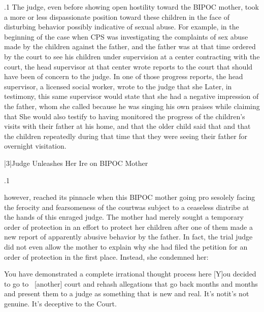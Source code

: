 \documentclass[11pt, twoside]{article}
\begin{document}
{\p.1{%
The judge, even before showing open hostility toward the BIPOC
mother, took a more or less dispassionate position toward these children
in the face of disturbing behavior possibly indicative of sexual abuse. For
example, in the beginning of the case when CPS was investigating the
complaints of sex abuse made by the children against the father, and the
father was at that time ordered by the court to see his children under
supervision at a center contracting with the court, the head supervisor
at that center wrote reports to the court that should have been of concern to the judge. In one of those progress reports, the head supervisor,
a licensed social worker, wrote to the judge that she 
Later, in testimony, this same supervisor would state that she had a negative impression of the father, whom she called  because he
was singing his own praises while claiming that  She would also testify to having monitored the progress
of the children’s visits with their father at his home, and that the older
child said that  and that the
children repeatedly  during that time that they were seeing
their father for overnight visitation.
}%


\s|3|{Judge Unleashes Her Ire on BIPOC Mother}

\p.1{%
\noindent{} however, reached its pinnacle when this BIPOC mother
going pro se\mdash{}solely facing the ferocity and fearsomeness of the
court\mdash{}was subject to a ceaseless diatribe at the hands of this enraged judge.
The mother had merely sought a temporary order of protection in an
effort to protect her children after one of them made a new report of
apparently abusive behavior by the father. In fact, the trial judge did not
even allow the mother to explain why she had filed the petition for an
order of protection in the first place. Instead, she condemned her:

\begin{blockQuote}
You have demonstrated a complete irrational thought process
here\ellFour{2pt}{2pt} [Y]ou decided to go to \ellThree{2pt}{2pt}\ [another] court and rehash
allegations that go back months and months and present them to a
judge as something that is new and real. It’s not\mdash{}it’s not genuine.
It’s deceptive to the Court.
\end{blockQuote}

}}
\end{document}
